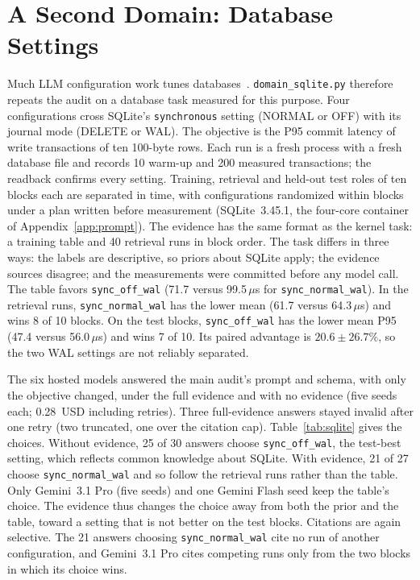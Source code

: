 \section{A Second Domain: Database Settings}
\label{app:sqlite}
Much LLM configuration work tunes databases~\cite{Trummer2022DBBERT,Lao2024GPTuner,Giannakouris2025LambdaTune}. \texttt{domain\_sqlite.py} therefore repeats the audit on a database task measured for this purpose. Four configurations cross SQLite's \texttt{synchronous} setting (NORMAL or OFF) with its journal mode (DELETE or WAL). The objective is the P95 commit latency of write transactions of ten 100-byte rows. Each run is a fresh process with a fresh database file and records 10 warm-up and 200 measured transactions; the readback confirms every setting. Training, retrieval and held-out test roles of ten blocks each are separated in time, with configurations randomized within blocks under a plan written before measurement (SQLite~3.45.1, the four-core container of Appendix~\ref{app:prompt}). The evidence has the same format as the kernel task: a training table and 40 retrieval runs in block order. The task differs in three ways: the labels are descriptive, so priors about SQLite apply; the evidence sources disagree; and the measurements were committed before any model call. The table favors \texttt{sync\_off\_wal} (71.7 versus 99.5\,$\mu$s for \texttt{sync\_normal\_wal}). In the retrieval runs, \texttt{sync\_normal\_wal} has the lower mean (61.7 versus 64.3\,$\mu$s) and wins 8 of 10 blocks. On the test blocks, \texttt{sync\_off\_wal} has the lower mean P95 (47.4 versus 56.0\,$\mu$s) and wins 7 of 10. Its paired advantage is $20.6\pm26.7\%$, so the two WAL settings are not reliably separated.

The six hosted models answered the main audit's prompt and schema, with only the objective changed, under the full evidence and with no evidence (five seeds each; 0.28~USD including retries). Three full-evidence answers stayed invalid after one retry (two truncated, one over the citation cap). Table~\ref{tab:sqlite} gives the choices. Without evidence, 25 of 30 answers choose \texttt{sync\_off\_wal}, the test-best setting, which reflects common knowledge about SQLite. With evidence, 21 of 27 choose \texttt{sync\_normal\_wal} and so follow the retrieval runs rather than the table. Only Gemini~3.1 Pro (five seeds) and one Gemini Flash seed keep the table's choice. The evidence thus changes the choice away from both the prior and the table, toward a setting that is not better on the test blocks. Citations are again selective. The 21 answers choosing \texttt{sync\_normal\_wal} cite no run of another configuration, and Gemini~3.1 Pro cites competing runs only from the two blocks in which its choice wins.

